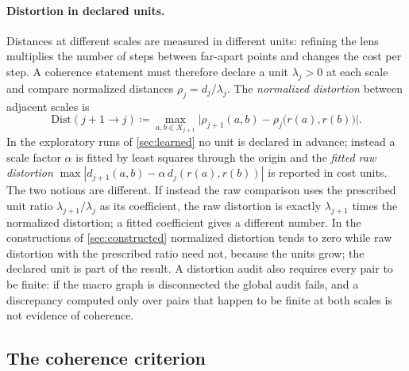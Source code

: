 \documentclass[11pt]{article}
\newcommand{\Dist}{\mathrm{Dist}}
\begin{document}
\paragraph{Distortion in declared units.}
Distances at different scales are measured in different units: refining the lens multiplies the number of steps between far-apart points and changes the cost per step.
A coherence statement must therefore declare a unit $\lambda_j>0$ at each scale and compare normalized distances $\rho_j=d_j/\lambda_j$.
The \emph{normalized distortion} between adjacent scales is
\begin{equation}
\Dist(j{+}1\to j)\coloneqq\max_{a,b\in X_{j+1}}\bigl|\rho_{j+1}(a,b)-\rho_j\bigl(r(a),r(b)\bigr)\bigr|.
\label{eq:distortion}
\end{equation}
In the exploratory runs of \cref{sec:learned} no unit is declared in advance; instead a scale factor $\alpha$ is fitted by least squares through the origin and the \emph{fitted raw distortion} $\max|d_{j+1}(a,b)-\alpha\,d_j(r(a),r(b))|$ is reported in cost units.
The two notions are different.
If instead the raw comparison uses the prescribed unit ratio $\lambda_{j+1}/\lambda_j$ as its coefficient, the raw distortion is exactly $\lambda_{j+1}$ times the normalized distortion; a fitted coefficient gives a different number.
In the constructions of \cref{sec:constructed} normalized distortion tends to zero while raw distortion with the prescribed ratio need not, because the units grow; the declared unit is part of the result.
A distortion audit also requires every pair to be finite: if the macro graph is disconnected the global audit fails, and a discrepancy computed only over pairs that happen to be finite at both scales is not evidence of coherence.

\subsection{The coherence criterion}
\end{document}
